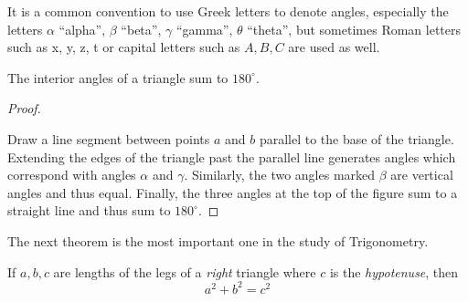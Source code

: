 It is a common convention to use Greek letters to denote angles,
especially the letters \(\alpha\) ``alpha'', \(\beta\) ``beta'',
\(\gamma\) ``gamma'', \(\theta\) ``theta'', but sometimes Roman
letters such as x, y, z, t or capital letters such as \(A,B,C\) are
used as well.

\begin{theorem}
  The interior angles of a triangle sum to \(180^{\circ}\).
\end{theorem}

\begin{proof}
  {~}
  \begin{center}
    
  \end{center}
  Draw a line segment between points \(a\) and \(b\) parallel to the
  base of the triangle. Extending the edges of the triangle past the
  parallel line generates angles which correspond with angles
  \(\alpha\) and \(\gamma\). Similarly, the two angles marked
  \(\beta\) are vertical angles and thus equal. Finally, the three
  angles at the top of the figure sum to a straight line and thus sum
  to \(180^{\circ}\).
\end{proof}

The next theorem is the most important one in the study of
Trigonometry.

\begin{theorem}
  If \(a, b, c\) are lengths of the legs of a \emph{right} triangle
  where \(c\) is the \emph{hypotenuse}, then
  \begin{equation}
    \label{eq:pythagorean-thm}
    a^{2} + b^{2} = c^{2}
  \end{equation}
\end{theorem}

